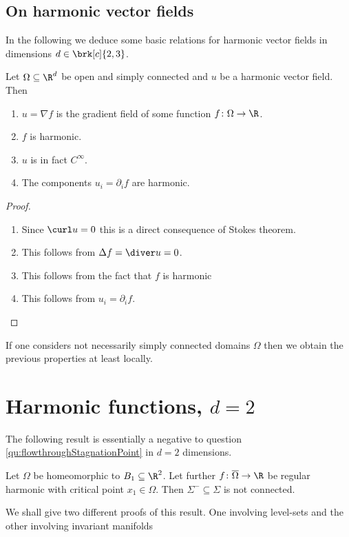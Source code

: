\section{On harmonic vector fields}

In the following we deduce some basic relations for harmonic vector fields in dimensions $d\in\brk[c]{2,3}$.
\begin{proposition}\label{pr:n2:hvf:simplyConnected}
  Let $\Omega\subseteq\R^d$ be open and simply connected and $u$ be a harmonic vector field. Then
  \begin{enumerate}
    \item 
    $u=\nabla f$ is the gradient field of some
    function $f\colon\Omega\to\R$.
    \item  $f$ is harmonic.
    \item $u$ is in fact $C^\infty$.
    \item The components $u_i=\partial_if$ are harmonic.
  \end{enumerate}
\end{proposition}
\begin{proof}
  \begin{enumerate}
    \item 
    Since $\curl u =0$ this is a direct consequence of Stokes theorem.
    \item This follows from $\Delta f = \diver u=0$.
    \item This follows from the fact that $f$ is harmonic
    \item This follows from $u_i=\partial_if$.
  \end{enumerate}
\end{proof}

If one considers not necessarily simply connected domains $\Omega$ then we obtain the previous
properties at least locally.

\newpage

\chapter{Harmonic functions, $d=2$}

The following result is essentially a negative to question \ref{qu:flowthroughStagnationPoint} in $d=2$ dimensions.
\begin{proposition}\label{pr:n2:hf:nonExistence}
  Let $\Omega$ be homeomorphic to $B_1\subseteq\R^2$. Let further $f\colon\overline{\Omega}\to\R$ be regular harmonic  
  with critical point $x_1\in\Omega$. Then $\Sigma^-\subseteq\Sigma$ is not connected.
\end{proposition}
We shall give two different proofs of this result. One involving level-sets and the other involving invariant manifolds

